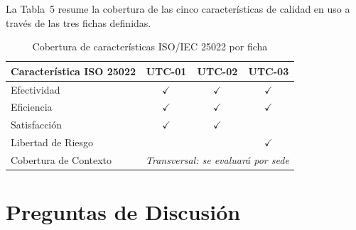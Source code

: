 \documentclass[12pt,a4paper]{article}
\begin{document}
La Tabla~5 resume la cobertura de las cinco caracter\'isticas de calidad en uso a trav\'es de las tres fichas definidas.

\begin{table}[H]
\centering
\caption{Cobertura de caracter\'isticas ISO/IEC 25022 por ficha}
\begin{tabular}{l c c c}
\toprule
\textbf{Caracter\'istica ISO 25022} & \textbf{UTC-01} & \textbf{UTC-02} & \textbf{UTC-03} \\
\midrule
Efectividad          & $\checkmark$ & $\checkmark$ & $\checkmark$ \\
Eficiencia           & $\checkmark$ & $\checkmark$ & $\checkmark$ \\
Satisfacci\'on        & $\checkmark$ & $\checkmark$ & \\
Libertad de Riesgo   &              &              & $\checkmark$ \\
Cobertura de Contexto & \multicolumn{3}{c}{\textit{Transversal: se evaluar\'a por sede}} \\
\bottomrule
\end{tabular}
\end{table}

\section{Preguntas de Discusi\'on}
\end{document}
